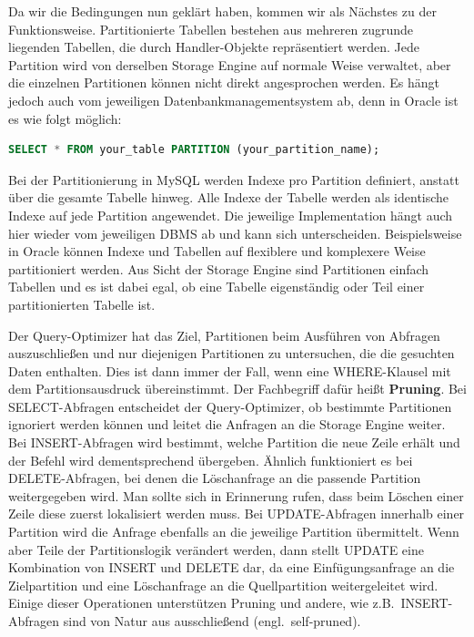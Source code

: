 Da wir die Bedingungen nun geklärt haben, kommen wir als Nächstes zu der Funktionsweise.
Partitionierte Tabellen bestehen aus mehreren zugrunde liegenden Tabellen, die durch Handler-Objekte repräsentiert werden.
Jede Partition wird von derselben Storage Engine auf normale Weise verwaltet, aber die einzelnen Partitionen können nicht direkt angesprochen werden.
Es hängt jedoch auch vom jeweiligen Datenbankmanagementsystem ab, denn in Oracle ist es wie folgt möglich:

\vspace{-5pt}
\begin{lstlisting}[language=SQL,label={lst:direct_partition}]
SELECT * FROM your_table PARTITION (your_partition_name);
\end{lstlisting}
\vspace{-7pt}

Bei der Partitionierung in MySQL werden Indexe pro Partition definiert, anstatt über die gesamte Tabelle hinweg.
Alle Indexe der Tabelle werden als identische Indexe auf jede Partition angewendet.
Die jeweilige Implementation hängt auch hier wieder vom jeweiligen DBMS ab und kann sich unterscheiden.
Beispielsweise in Oracle können Indexe und Tabellen auf flexiblere und komplexere Weise partitioniert werden.
Aus Sicht der Storage Engine sind Partitionen einfach Tabellen und es ist dabei egal, ob eine Tabelle eigenständig oder Teil einer partitionierten Tabelle ist.

Der Query-Optimizer hat das Ziel, Partitionen beim Ausführen von Abfragen auszuschließen und nur diejenigen Partitionen zu untersuchen, die die gesuchten Daten enthalten.
Dies ist dann immer der Fall, wenn eine WHERE-Klausel mit dem Partitionsausdruck übereinstimmt.
Der Fachbegriff dafür heißt \textbf{Pruning}.
Bei SELECT-Abfragen entscheidet der Query-Optimizer, ob bestimmte Partitionen ignoriert werden können und leitet die Anfragen an die Storage Engine weiter.
Bei INSERT-Abfragen wird bestimmt, welche Partition die neue Zeile erhält und der Befehl wird dementsprechend übergeben.
Ähnlich funktioniert es bei DELETE-Abfragen, bei denen die Löschanfrage an die passende Partition weitergegeben wird.
Man sollte sich in Erinnerung rufen, dass beim Löschen einer Zeile diese zuerst lokalisiert werden muss.
Bei UPDATE-Abfragen innerhalb einer Partition wird die Anfrage ebenfalls an die jeweilige Partition übermittelt.
Wenn aber Teile der Partitionslogik verändert werden, dann stellt UPDATE eine Kombination von INSERT und DELETE dar, da eine Einfügungsanfrage an die Zielpartition und eine Löschanfrage an die Quellpartition weitergeleitet wird.
Einige dieser Operationen unterstützen Pruning und andere, wie z.B.\ INSERT-Abfragen sind von Natur aus ausschließend (engl.\ self-pruned).

